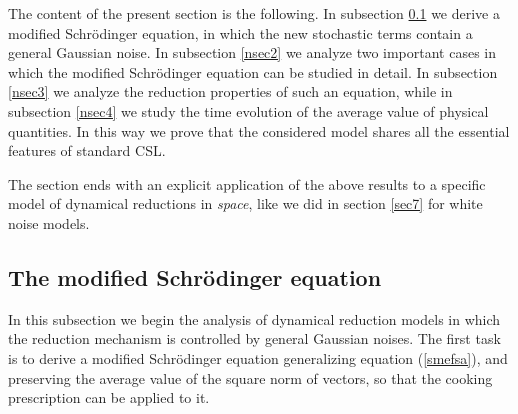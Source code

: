 \documentclass[10pt,a4paper]{article}
\begin{document}
The content of the present section is the following. In subsection
\ref{nsec1} we derive a modified Schr\"odinger equation, in which
the new stochastic terms contain a general Gaussian noise. In
subsection \ref{nsec2} we analyze two important cases in which the
modified Schr\"odinger equation can be studied in detail. In
subsection \ref{nsec3} we analyze the reduction properties of such
an equation, while in subsection \ref{nsec4} we study the time
evolution of the average value of physical quantities. In this way
we prove that the considered model shares all the essential
features of standard CSL.

The section ends with an explicit application of the above results
to a specific model of dynamical reductions in {\it space}, like
we did in section \ref{sec7} for white noise models.

\subsection{The modified Schr\"odinger equation} \label{nsec1}

In this subsection we begin the analysis of dynamical reduction
models in which the reduction mechanism is controlled by general
Gaussian noises. The first task is to derive a modified
Schr\"odinger equation generalizing equation (\ref{smefsa}), and
preserving the average value of the square norm of vectors, so
that the cooking prescription can be applied to it.
\end{document}
